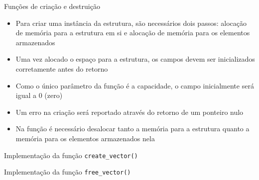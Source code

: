\begin{frame}[fragile]{Funções de criação e destruição}

    \begin{itemize}
        \item Para criar uma instância da estrutura, são necessários dois passos: alocação de
        memória para a estrutura em si e alocação de memória para os elementos armazenados

        \item Uma vez alocado o espaço para a estrutura, os campos devem ser inicializados 
        corretamente antes do retorno

        \item Como o único parâmetro da função  é a capacidade, o campo
         inicialmente será igual a 0 (zero)

        \item Um erro na criação será reportado através do retorno de um ponteiro nulo

        \item Na função  é necessário desalocar tanto a memória para a
        estrutura quanto a memória para os elementos armazenados nela
    \end{itemize}

\end{frame}

\begin{frame}[fragile]{Implementação da função \texttt{create\_vector()}}
\end{frame}

\begin{frame}[fragile]{Implementação da função \texttt{free\_vector()}}
\end{frame}

